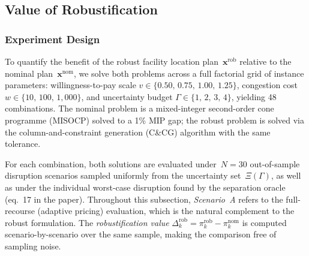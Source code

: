

\subsection{Value of Robustification}
\label{subsec:value_robustification}

\subsubsection*{Experiment Design}

To quantify the benefit of the robust facility location plan~$\mathbf{x}^{\mathrm{rob}}$
relative to the nominal plan~$\mathbf{x}^{\mathrm{nom}}$, we solve both problems across
a full factorial grid of instance parameters: willingness-to-pay scale
$v \in \{0.50,\, 0.75,\, 1.00,\, 1.25\}$, congestion cost
$w \in \{10,\, 100,\, 1{,}000\}$, and uncertainty budget
$\Gamma \in \{1,\, 2,\, 3,\, 4\}$, yielding 48 combinations.
The nominal problem is a mixed-integer second-order cone programme (MISOCP)
solved to a 1\% MIP gap; the robust problem is solved via the
column-and-constraint generation (C\&CG) algorithm with the same tolerance.

For each combination, both solutions are evaluated under~$N = 30$
out-of-sample disruption scenarios sampled uniformly from the uncertainty
set~$\Xi(\Gamma)$, as well as under the individual worst-case disruption
found by the separation oracle (eq.~17 in the paper).
Throughout this subsection, \emph{Scenario~A} refers to the full-recourse
(adaptive pricing) evaluation, which is the natural complement to the
robust formulation.  The \emph{robustification value}
$\Delta^{\mathrm{rob}}_k = \pi^{\mathrm{rob}}_k - \pi^{\mathrm{nom}}_k$
is computed scenario-by-scenario over the same sample, making the
comparison free of sampling noise.

